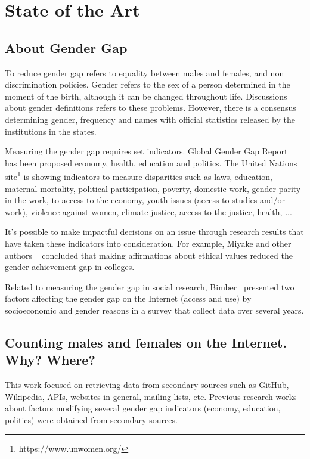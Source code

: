 \documentclass[a4paper]{article}
\begin{document}
\section{State of the Art}
\label{sec:stateofart}

\subsection{About Gender Gap}

To reduce gender gap refers to equality between males and females,
and non discrimination policies. Gender refers to the sex of a person
determined in the moment of the birth, although it can be changed
throughout life. Discussions about gender definitions refers to these
problems. However, there is a consensus determining gender, frequency
and names with official statistics released by the institutions in the
states.

Measuring the gender gap requires set indicators. Global Gender Gap
Report~\cite{chancel2022world} has been proposed economy, health,
education and politics. The United Nations
site\footnote{https://www.unwomen.org/} is showing indicators
to measure disparities such as laws, education, maternal mortality,
political participation, poverty, domestic work, gender parity in
the work, to access to the economy, youth issues (access to
studies and/or work), violence against women, climate justice,
access to the justice, health, ...

It's possible to make impactful decisions on an issue through research
results that have taken these indicators into consideration. For example,
Miyake and other authors ~\cite{miyake2010reducing} concluded that making
affirmations about ethical values reduced the gender achievement gap in colleges.

Related to measuring the gender gap in social research,
Bimber~\cite{bimber2000measuring} presented two factors affecting
the gender gap on the Internet (access and use) by socioeconomic and gender
reasons in a survey that collect data over several years.

\subsection{Counting males and females on the Internet. Why? Where?}

This work focused on retrieving data from secondary sources such as
GitHub, Wikipedia, APIs, websites in general, mailing lists, etc.
Previous research works about factors modifying several gender gap
indicators (economy, education, politics) were obtained from secondary
sources.
\end{document}
